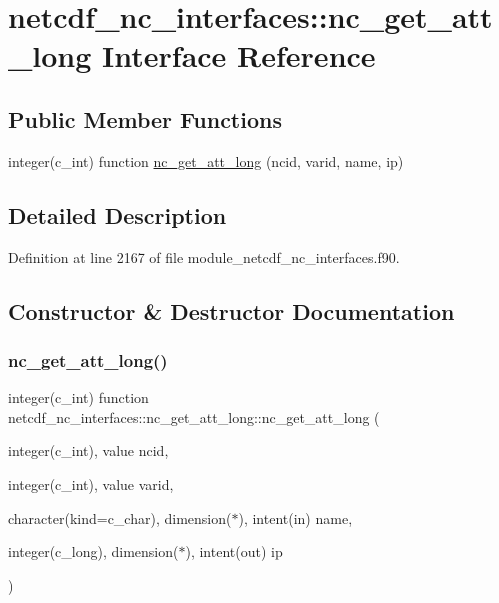 \hypertarget{interfacenetcdf__nc__interfaces_1_1nc__get__att__long}{}\section{netcdf\+\_\+nc\+\_\+interfaces\+:\+:nc\+\_\+get\+\_\+att\+\_\+long Interface Reference}
\label{interfacenetcdf__nc__interfaces_1_1nc__get__att__long}
\subsection*{Public Member Functions}
\begin{DoxyCompactItemize}
\item 
integer(c\+\_\+int) function \hyperlink{interfacenetcdf__nc__interfaces_1_1nc__get__att__long_a6067e416baf2f71199e3f16993546308}{nc\+\_\+get\+\_\+att\+\_\+long} (ncid, varid, name, ip)
\end{DoxyCompactItemize}


\subsection{Detailed Description}


Definition at line 2167 of file module\+\_\+netcdf\+\_\+nc\+\_\+interfaces.\+f90.



\subsection{Constructor \& Destructor Documentation}
\mbox{\label{interfacenetcdf__nc__interfaces_1_1nc__get__att__long_a6067e416baf2f71199e3f16993546308}} 
\subsubsection{\texorpdfstring{nc\+\_\+get\+\_\+att\+\_\+long()}{nc\_get\_att\_long()}}
{\footnotesize\ttfamily integer(c\+\_\+int) function netcdf\+\_\+nc\+\_\+interfaces\+::nc\+\_\+get\+\_\+att\+\_\+long\+::nc\+\_\+get\+\_\+att\+\_\+long (\begin{DoxyParamCaption}\item[{integer(c\+\_\+int), value}]{ncid,  }\item[{integer(c\+\_\+int), value}]{varid,  }\item[{character(kind=c\+\_\+char), dimension($\ast$), intent(in)}]{name,  }\item[{integer(c\+\_\+long), dimension($\ast$), intent(out)}]{ip }\end{DoxyParamCaption})}



